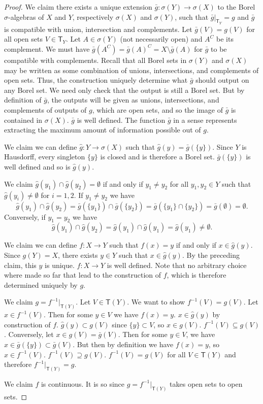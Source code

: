 \documentclass[review]{elsarticle}
\theoremstyle{plain}%
\theoremstyle{definition}
\theoremstyle{remark}
\begin{document}
\begin{proof}
	We claim there exists a unique extension $\bar{g}:\sigma(Y)\to\sigma(X)$ to the Borel $\sigma$-algebras of $X$ and $Y$, respectively $\sigma(X)$ and $\sigma(Y)$, such that $\bar{g}|_{\mathsf{T}_Y}=g$ and $\bar{g}$ is compatible with union, intersection and complements. Let $\bar{g}(V) = g(V)$ for all open sets $V \in \mathsf{T}_Y$. Let $A \in \sigma(Y)$ (not necessarily open) and $A^C$ be its complement. We must have $\bar{g}(A^C) = \bar{g}(A)^C = X\setminus \bar{g}(A)$ for $\bar{g}$ to be compatible with complements. Recall that all Borel sets in $\sigma(Y)$ and $\sigma(X)$ may be written as some combination of unions, intersections, and complements of open sets. Thus, the construction uniquely determine what $\bar{g}$ should output on any Borel set. We need only check that the output is still a Borel set. But by definition of $\bar{g}$, the outputs will be given as unions, intersections, and complements of outputs of $g$, which are open sets, and so the image of $\bar{g}$ is contained in $\sigma(X)$.  $\bar{g}$ is well defined. The function $\bar{g}$ in a sense represents extracting the maximum amount of information possible out of $g$.
	
	We claim we can define $\hat{g}:Y\to\sigma(X)$ such that $\hat{g}(y) = \bar{g}(\{y\})$. Since $Y$ is Hausdorff, every singleton $\{y\}$ is closed and is therefore a Borel set. $\bar{g}(\{y\})$ is well defined and so is $\hat{g}(y)$.
	
	We claim  $\hat{g}(y_1)\cap\hat{g}(y_2) = \emptyset$ if and only if $y_1\neq y_2$ for all $y_1,y_2\in Y$ such that $\hat{g}(y_i)\neq\emptyset$ for $i=1,2$. If $y_1\neq y_2$ we have
	$$
	\hat{g}(y_1)\cap\hat{g}(y_2) = \bar{g}(\{y_1\})\cap\bar{g}(\{y_2\}) = \bar{g}(\{y_1\}\cap\{y_2\}) = \bar{g}(\emptyset) = \emptyset.
	$$
	Conversely, if $y_1 = y_2$ we have
	$$
	\hat{g}(y_1)\cap\hat{g}(y_2) = 	\hat{g}(y_1)\cap\hat{g}(y_1) = 
	\hat{g}(y_1) \neq \emptyset.
	$$
	
	We claim we can define $f: X\to Y$ such that $f(x) = y$ if and only if $x\in \hat{g}(y)$. Since $g(Y)=X$, there exists $y\in Y$ such that $x\in\hat{g}(y)$. By the preceding claim, this $y$ is unique. $f: X\to Y$ is well defined. Note that no arbitrary choice where made so far that lead to the construction of $f$, which is therefore determined uniquely by $g$. 
	
	We claim $g = f^{-1} |_{\mathsf{T}(Y)}$. Let $V\in\mathsf{T}(Y)$. We want to show $f^{-1}(V) = g(V)$. Let $x\in f^{-1}(V)$. Then for some $y \in V$ we have $f(x)=y$. $x\in \hat{g}(y)$ by construction of $f$. $\hat{g}(y) \subset g(V)$ since $\{y\}\subset V$, so $x\in g(V)$. $f^{-1}(V) \subseteq g(V)$. Conversely, let $x\in g(V)=\bar{g}(V)$. Then for some $y\in V$, we have $x\in\bar{g}(\{y\})\subset\bar{g}(V)$. But then by definition we have $f(x)=y$, so $x\in f^{-1}(V)$. $f^{-1}(V) \supseteq g(V)$. $f^{-1}(V) = g(V)$ for all $V\in\mathsf{T}(Y)$ and therefore $f^{-1}|_{\mathsf{T}(Y)}=g$.
	
	We claim $f$ is continuous. It is so since $g = f^{-1} |_{\mathsf{T}(Y)}$ takes open sets to open sets. 
\end{proof}
\end{document}
